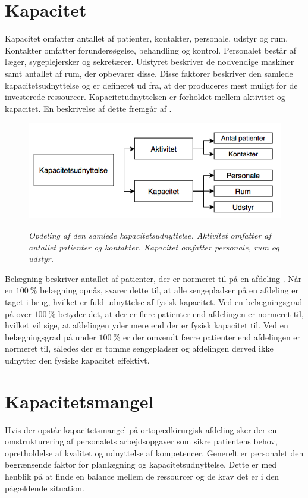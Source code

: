 \section{Kapacitet} \label{kap}
Kapacitet omfatter antallet af patienter, kontakter, personale, udstyr og rum. Kontakter omfatter forundersøgelse, behandling og kontrol. Personalet består af læger, sygeplejersker og sekretærer. Udstyret beskriver de nødvendige maskiner samt antallet af rum, der opbevarer disse. Disse faktorer beskriver den samlede kapacitetsudnyttelse og er defineret ud fra, at der produceres mest muligt for de investerede ressourcer. Kapacitetudnyttelsen er forholdet mellem aktivitet og kapacitet. \cite{Company2013} En beskrivelse af dette fremgår af . 

\begin{figure}[H]
	\flushleft 
	\centering
	\includegraphics[scale=.45]{figures/Kapacitetsudnyttelse.png}
	\label{kapacitet}
	\flushleft
	\caption{\textit{Opdeling af den samlede kapacitetsudnyttelse. Aktivitet omfatter af antallet patienter og kontakter. Kapacitet omfatter personale, rum og udstyr. \cite{Company2013}}}
\end{figure}

\noindent
Belægning beskriver antallet af patienter, der er normeret til på en afdeling \cite{Heidmann2014}. Når en $100~\%$ belægning opnås, svarer dette til, at alle sengepladser på en afdeling er taget i brug, hvilket er fuld udnyttelse af fysisk kapacitet. Ved en belægningsgrad på over $100~\%$ betyder det, at der er flere patienter end afdelingen er normeret til, hvilket vil sige, at afdelingen yder mere end der er fysisk kapacitet til. Ved en belægningsgrad på under $100~\%$ er der omvendt færre patienter end afdelingen er normeret til, således der er tomme sengepladser og afdelingen derved ikke udnytter den fysiske kapacitet effektivt. \cite{Pauly1986} 

\section{Kapacitetsmangel}
Hvis der opstår kapacitetsmangel på ortopædkirurgisk afdeling sker der en omstrukturering af personalets arbejdsopgaver som sikre patientens behov, opretholdelse af kvalitet og udnyttelse af kompetencer. Generelt er personalet den begrænsende faktor for planlægning og kapacitetsudnyttelse\cite{Company2013}. Dette er med henblik på at finde en balance mellem de ressourcer og de krav det er i den pågældende situation. \cite{Bjerg2016} 

